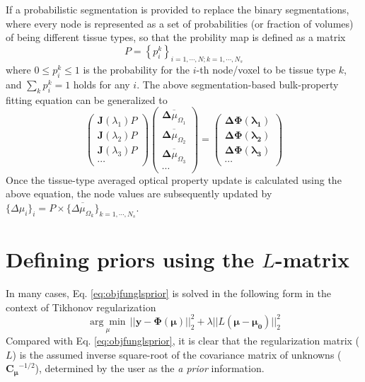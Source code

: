 \documentclass[12pt]{book}               %
\begin{document}
If a probabilistic segmentation is provided to replace the binary segmentations, where every node is represented as a set of probabilities (or fraction of volumes) of being different tissue types, so that the probility map is defined as a matrix
\begin{equation}
P=\left\{p^k_{i}\right\}_{i=1,\cdots,N; k=1,\cdots,N_s}
\end{equation}
where $0\le p^k_{i} \le 1$ is the probability for the $i$-th node/voxel to be tissue type $k$, and $\sum_k{p^k_{i}}=1$ holds for any $i$. The above segmentation-based bulk-property fitting equation can be generalized to
\begin{equation}\label{eq:multispectralfuzzysegbulk}
\left(
\begin{array}{c}
\mathbf{J}(\lambda_1)P\\
\mathbf{J}(\lambda_2)P\\
\mathbf{J}(\lambda_3)P\\
\cdots 
\end{array}\right)
\left(
\begin{array}{c}
\overline{\boldsymbol{\Delta}{\mu_{\Omega_1}}}\\
\overline{\boldsymbol{\Delta}{\mu_{\Omega_2}}}\\
\overline{\boldsymbol{\Delta}{\mu_{\Omega_3}}}\\
\cdots
\end{array}
\right)=\left(
\begin{array}{c}
\boldsymbol{\Delta\Phi(\lambda_1)}\\
\boldsymbol{\Delta\Phi(\lambda_2)}\\
\boldsymbol{\Delta\Phi(\lambda_3)}\\
\cdots
\end{array}\right)
\end{equation}
Once the tissue-type averaged optical property update is calculated using the above equation, the node values are subsequently updated by $\{\Delta\mu_i\}_i=P\times\{\overline{\Delta\mu_{\Omega_k}}\}_{k=1,\cdots,N_s}$.

\section{Defining priors using the $L$-matrix}\label{sec:Lmatrix}
In many cases, Eq. \ref{eq:objfunglsprior} is solved in the following form in the context of Tikhonov regularization
\begin{equation}
\underset{\mu}{\arg\min} \, || \boldsymbol{y-\Phi(\mu)} ||^2_2 + \lambda|| L(\boldsymbol{\mu-\mu_0}) ||^2_2
\end{equation}
Compared with Eq. \ref{eq:objfunglsprior}, it is clear that the regularization matrix ($L$) is the assumed inverse square-root of the covariance matrix of unknowns ($\mathbf{C_\mu}^{-1/2}$), determined by the user as the \emph{a prior} information.
\end{document}
